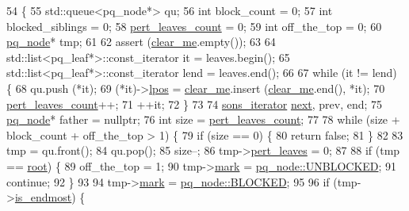 \begin{DoxyCode}
54 \{
55     std::queue<pq\_node*> qu;
56     \textcolor{keywordtype}{int} block\_count = 0;
57     \textcolor{keywordtype}{int} blocked\_siblings = 0;
58     \mbox{\hyperlink{classpq__tree_a73eb0b66a10e300745e76df657767ef5}{pert\_leaves\_count}} = 0;
59     \textcolor{keywordtype}{int} off\_the\_top = 0;
60     \mbox{\hyperlink{classpq__node}{pq\_node}}* tmp;
61     
62     assert (\mbox{\hyperlink{classpq__tree_a43bcdb58d91b7e20860f523f49c74fd1}{clear\_me}}.empty());
63     
64     std::list<pq\_leaf*>::const\_iterator it = leaves.begin(); 
65     std::list<pq\_leaf*>::const\_iterator lend = leaves.end();
66     
67     \textcolor{keywordflow}{while} (it != lend) \{
68     qu.push (*it);
69     (*it)->\mbox{\hyperlink{classpq__node_a71cc9bb3c11aac468ff77d64643c38dc}{lpos}} = \mbox{\hyperlink{classpq__tree_a43bcdb58d91b7e20860f523f49c74fd1}{clear\_me}}.insert (\mbox{\hyperlink{classpq__tree_a43bcdb58d91b7e20860f523f49c74fd1}{clear\_me}}.end(), *it);
70     \mbox{\hyperlink{classpq__tree_a73eb0b66a10e300745e76df657767ef5}{pert\_leaves\_count}}++;
71     ++it;
72     \}
73     
74     \mbox{\hyperlink{classpq__tree_ab47263066d4b0acc70e00043870d748a}{sons\_iterator}} \mbox{\hyperlink{struct_g_m_l__pair_aef47e6103f05e1411fa55f731972b592}{next}}, prev, end;
75     \mbox{\hyperlink{classpq__node}{pq\_node}}* father = \textcolor{keyword}{nullptr};
76     \textcolor{keywordtype}{int} size = \mbox{\hyperlink{classpq__tree_a73eb0b66a10e300745e76df657767ef5}{pert\_leaves\_count}};
77     
78     \textcolor{keywordflow}{while} (size + block\_count + off\_the\_top > 1) \{
79     \textcolor{keywordflow}{if} (size == 0) \{
80         \textcolor{keywordflow}{return} \textcolor{keyword}{false};
81     \}
82     
83     tmp = qu.front();
84     qu.pop();
85     size--;
86     tmp->\mbox{\hyperlink{classpq__node_a3fb78609f93f41efd6826ed3169fc312}{pert\_leaves}} = 0;
87     
88     \textcolor{keywordflow}{if} (tmp == \mbox{\hyperlink{classpq__tree_ad8e4e2235fe68fb99769cec54e1760ba}{root}}) \{
89         off\_the\_top = 1;
90         tmp->\mbox{\hyperlink{classpq__node_aee913582a7b268ce2570bee8a8367c50}{mark}} = \mbox{\hyperlink{classpq__node_a6236b20cd5f6cc02cb5f637ed34c96d9a8a88820f8cee58f43fef7160cdf1d7dc}{pq\_node::UNBLOCKED}};
91         \textcolor{keywordflow}{continue};
92     \}   
93 
94     tmp->\mbox{\hyperlink{classpq__node_aee913582a7b268ce2570bee8a8367c50}{mark}} = \mbox{\hyperlink{classpq__node_a6236b20cd5f6cc02cb5f637ed34c96d9a70312622ded9f04f068838ec195fc53c}{pq\_node::BLOCKED}};
95     
96     \textcolor{keywordflow}{if} (tmp->\mbox{\hyperlink{classpq__node_a058dda3d1197dfd2b343d1983d305d79}{is\_endmost}}) \{

\end{DoxyCode}
